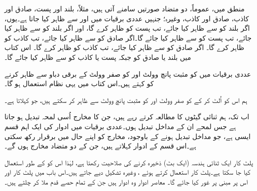 منطق میں، عموماً، دو متضاد صورتیں سامنے آتی ہیں، مثلاً، بلند اور پست، صادق اور کاذب، صادق اور کاذب، وغیرہ؛ جنہیں عددی برقیات میں  اور  سے ظاہر کیا جاتا ہے۔یوں، اگر بلند کو  سے ظاہر کیا جائے، تب پست کو  ظاہر کرے گا، اور اگر بلند کو سے ظاہر کیا جائے، تب پست کو  سے ظاہر کیا جائے گا۔اگر صادق کو  سے ظاہر کیا جائے، تب کاذب کو  ظاہر کرے گا۔ اگر صادق کو  سے ظاہر کیا جائے، تب کاذب کو  ظاہر کرے گا۔ اس کتاب میں بلند یا صادق کو  جبکہ پست یا کاذب کو  سے ظاہر کیا جائے گا۔

عددی برقیات میں  کو مثبت پانچ وولٹ  اور  کو صفر وولٹ  کے برقی دباو سے ظاہر کرنے کو  کہتے ہیں۔اس کتاب میں یہی نظام استعمال ہو گا۔

ہم اس کو اُلٹ کر کے  کو صفر وولٹ  اور  کو مثبت پانچ وولٹ  سے ظاہر کر سکتے ہیں، جو  کہلاتا ہے۔


اب تک، ہم ثنائی گیٹوں کا مطالعہ کرتے رہے ہیں، جن کا مخارج اُسی لمحہ تبدیل ہو جاتا ہے جس لمحے ان کے مداخل تبدیل ہوں۔عددی برقیات میں ادوار کی ایک اہم قسم ایسی ہے، جو مداخل تبدیل ہونے کے باوجود، مخارج کو اپنے حال میں برقرار رکھ سکتی ہے۔اس قسم کے ادوار  کہلاتے ہیں، جن کے دو متضاد مخارج ہوں گے۔

پلٹ کار ایک ثنائی ہندسہ (ایک بٹ) ذخیرہ کرنے کی صلاحیت رکھتا ہے، لہٰذا اس کو  کے طور استعمال کیا جا سکتا ہے۔پلٹ کار استعمال کرتے ہوئے ، وغیرہ تشکیل دیے جاتے ہیں۔اس باب میں پلٹ کار اور اس پر مبنی  پر غور کیا جائے گا۔ معاصر ادوار وہ ادوار ہیں جن کے تمام حصے قدم ملا کر چلتے ہیں۔


